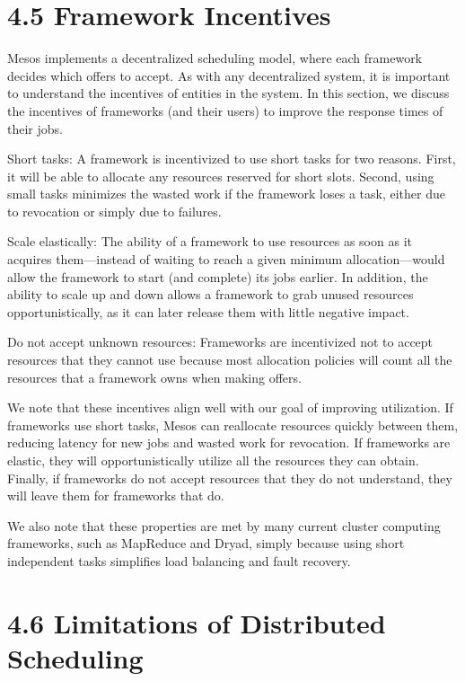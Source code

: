 \documentclass[
]{article}
\begin{document}
\section{4.5 Framework Incentives}\label{framework-incentives}

Mesos implements a decentralized scheduling model, where each framework
decides which offers to accept. As with any decentralized system, it is
important to understand the incentives of entities in the system. In
this section, we discuss the incentives of frameworks (and their users)
to improve the response times of their jobs.

Short tasks: A framework is incentivized to use short tasks for two
reasons. First, it will be able to allocate any resources reserved for
short slots. Second, using small tasks minimizes the wasted work if the
framework loses a task, either due to revocation or simply due to
failures.

Scale elastically: The ability of a framework to use resources as soon
as it acquires them---instead of waiting to reach a given minimum
allocation---would allow the framework to start (and complete) its jobs
earlier. In addition, the ability to scale up and down allows a
framework to grab unused resources opportunistically, as it can later
release them with little negative impact.

Do not accept unknown resources: Frameworks are incentivized not to
accept resources that they cannot use because most allocation policies
will count all the resources that a framework owns when making offers.

We note that these incentives align well with our goal of improving
utilization. If frameworks use short tasks, Mesos can reallocate
resources quickly between them, reducing latency for new jobs and wasted
work for revocation. If frameworks are elastic, they will
opportunistically utilize all the resources they can obtain. Finally, if
frameworks do not accept resources that they do not understand, they
will leave them for frameworks that do.

We also note that these properties are met by many current cluster
computing frameworks, such as MapReduce and Dryad, simply because using
short independent tasks simplifies load balancing and fault recovery.

\section{4.6 Limitations of Distributed
Scheduling}\label{limitations-of-distributed-scheduling}
\end{document}
